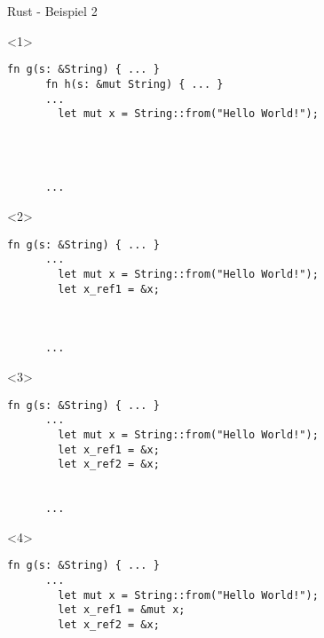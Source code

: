 

\lstset{showstringspaces=true,columns=fullflexible,keepspaces=true}

\begin{frame}[fragile]{Rust - Beispiel 2}


  \begin{onlyenv}<1> {
    \begin{lstlisting}[frame=single,style=base]
      fn g(s: &String) { ... }
      fn h(s: &mut String) { ... }
      ...
        let mut x = String::from("Hello World!");




      ...
    \end{lstlisting}
  }
  \end{onlyenv}


  \begin{onlyenv}<2> {
    \begin{lstlisting}[frame=single,style=base]
      fn g(s: &String) { ... }
      ...
        let mut x = String::from("Hello World!");
        let x_ref1 = &x;



      ...
    \end{lstlisting}
  }
  \end{onlyenv}


  \begin{onlyenv}<3> {
    \begin{lstlisting}[frame=single,style=base]
      fn g(s: &String) { ... }
      ...
        let mut x = String::from("Hello World!");
        let x_ref1 = &x;
        let x_ref2 = &x;


      ...
    \end{lstlisting}
  }
  \end{onlyenv}


  \begin{onlyenv}<4> {
    \begin{lstlisting}[frame=single,style=base]
      fn g(s: &String) { ... }
      ...
        let mut x = String::from("Hello World!");
        let x_ref1 = &mut x;
        let x_ref2 = &x;



\end{lstlisting}}
\end{onlyenv}
\end{frame}
